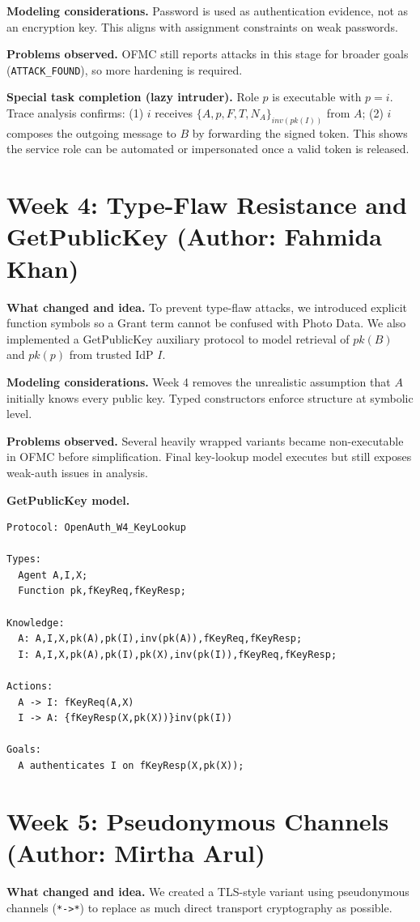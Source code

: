 \documentclass[11pt,a4paper]{article}
\begin{document}
\textbf{Modeling considerations.}
Password is used as authentication evidence, not as an encryption key.
This aligns with assignment constraints on weak passwords.

\textbf{Problems observed.}
OFMC still reports attacks in this stage for broader goals (\texttt{ATTACK\_FOUND}), so more hardening is required.

\textbf{Special task completion (lazy intruder).}
Role $p$ is executable with $p=i$.
Trace analysis confirms: (1) $i$ receives $\{A,p,F,T,N_A\}_{inv(pk(I))}$ from $A$; (2) $i$ composes the outgoing message to $B$ by forwarding the signed token.
This shows the service role can be automated or impersonated once a valid token is released.

\section{Week 4: Type-Flaw Resistance and GetPublicKey (Author: Fahmida Khan)}
\textbf{What changed and idea.}
To prevent type-flaw attacks, we introduced explicit function symbols so a Grant term cannot be confused with Photo Data.
We also implemented a GetPublicKey auxiliary protocol to model retrieval of $pk(B)$ and $pk(p)$ from trusted IdP $I$.

\textbf{Modeling considerations.}
Week 4 removes the unrealistic assumption that $A$ initially knows every public key.
Typed constructors enforce structure at symbolic level.

\textbf{Problems observed.}
Several heavily wrapped variants became non-executable in OFMC before simplification.
Final key-lookup model executes but still exposes weak-auth issues in analysis.

\textbf{GetPublicKey model.}
\begin{lstlisting}
Protocol: OpenAuth_W4_KeyLookup

Types:
  Agent A,I,X;
  Function pk,fKeyReq,fKeyResp;

Knowledge:
  A: A,I,X,pk(A),pk(I),inv(pk(A)),fKeyReq,fKeyResp;
  I: A,I,X,pk(A),pk(I),pk(X),inv(pk(I)),fKeyReq,fKeyResp;

Actions:
  A -> I: fKeyReq(A,X)
  I -> A: {fKeyResp(X,pk(X))}inv(pk(I))

Goals:
  A authenticates I on fKeyResp(X,pk(X));
\end{lstlisting}

\section{Week 5: Pseudonymous Channels (Author: Mirtha Arul)}
\textbf{What changed and idea.}
We created a TLS-style variant using pseudonymous channels (\texttt{*->*}) to replace as much direct transport cryptography as possible.
\end{document}
